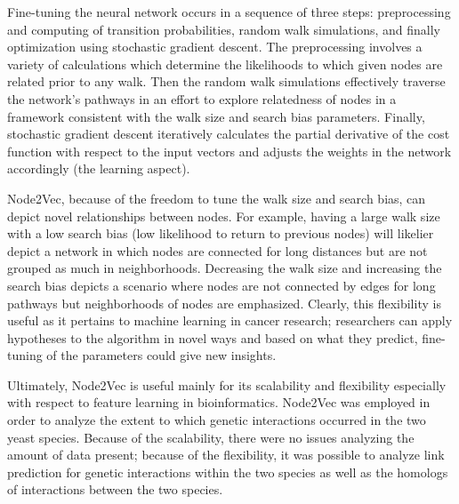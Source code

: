 Fine-tuning the neural network occurs in a sequence of three steps: preprocessing and computing of transition probabilities, random walk simulations, and finally optimization using stochastic gradient descent. The preprocessing involves a variety of calculations which determine the likelihoods to which given nodes are related prior to any walk. Then the random walk simulations effectively traverse the network's pathways in an effort to explore relatedness of nodes in a framework consistent with the walk size and search bias parameters. Finally, stochastic gradient descent iteratively calculates the partial derivative of the cost function with respect to the input vectors and adjusts the weights in the network accordingly (the learning aspect).

Node2Vec, because of the freedom to tune the walk size and search bias, can depict novel relationships between nodes. For example, having a large walk size with a low search bias (low likelihood to return to previous nodes) will likelier depict a network in which nodes are connected for long distances but are not grouped as much in neighborhoods. Decreasing the walk size and increasing the search bias depicts a scenario where nodes are not connected by edges for long pathways but neighborhoods of nodes are emphasized. Clearly, this flexibility is useful as it pertains to machine learning in cancer research; researchers can apply hypotheses to the algorithm in novel ways and based on what they predict, fine-tuning of the parameters could give new insights.

Ultimately, Node2Vec is useful mainly for its scalability and flexibility especially with respect to feature learning in bioinformatics. Node2Vec was employed in order to analyze the extent to which genetic interactions occurred in the two yeast species. Because of the scalability, there were no issues analyzing the amount of data present; because of the flexibility, it was possible to analyze link prediction for genetic interactions within the two species as well as the homologs of interactions between the two species.




